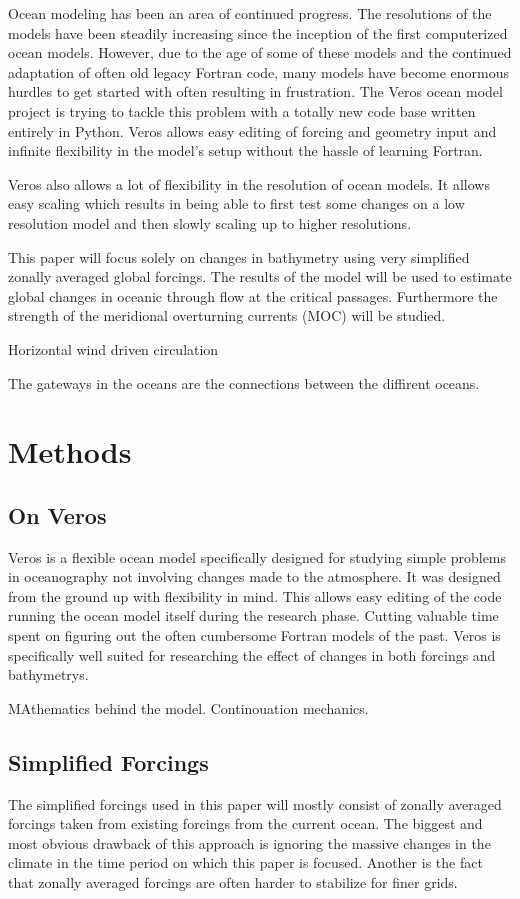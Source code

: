 \documentclass[a4paper]{article}
\begin{document}
\begin{multicols}{2}
Ocean modeling has been an area of continued progress. The resolutions of the models have been steadily increasing since the inception of the first computerized ocean models. However, due to the age of some of these models and the continued adaptation of often old legacy Fortran code, many models have become enormous hurdles to get started with often resulting in frustration. The Veros\cite{Hafner2018Aug} ocean model project is trying to tackle this problem with a totally new code base written entirely in Python. Veros allows easy editing of forcing and geometry input and infinite flexibility in the model's setup without the hassle of learning Fortran.

Veros also allows a lot of flexibility in the resolution of ocean models. It allows easy scaling which results in being able to first test some changes on a low resolution model and then slowly scaling up to higher resolutions.

This paper will focus solely on changes in bathymetry using very simplified zonally averaged global forcings. The results of the model will be used to estimate global changes in oceanic through flow at the critical passages. Furthermore the strength of the meridional overturning currents (MOC) will be studied.

Horizontal wind driven circulation

The gateways in the oceans are the connections between the diffirent oceans. 


\section{Methods}
\subsection{On Veros}
Veros is a flexible ocean model specifically designed for studying simple problems in oceanography not involving changes made to the atmosphere. It was designed from the ground up with flexibility in mind. This allows easy editing of the code running the ocean model itself during the research phase. Cutting valuable time spent on figuring out the often cumbersome Fortran models of the past. Veros is specifically well suited for researching the effect of changes in both forcings and bathymetrys.

MAthematics behind the model. Continouation mechanics.


\subsection{Simplified Forcings}
The simplified forcings used in this paper will mostly consist of zonally averaged forcings taken from existing forcings from the current ocean. The biggest and most obvious drawback of this approach is ignoring the massive changes in the climate in the time period on which this paper is focused. Another is the fact that zonally averaged forcings are often harder to stabilize for finer grids.



\end{multicols}
\end{document}
